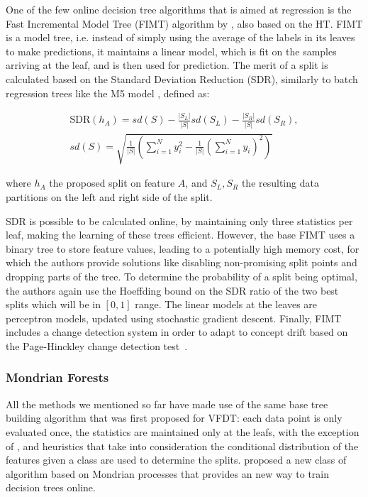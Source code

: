 One of the few online decision tree algorithms that is aimed at regression
is the Fast Incremental Model Tree (FIMT) algorithm by \citet{fimt}, also
based on the HT. FIMT
is a model tree, i.e. instead of simply using the average of the labels
in its leaves to make predictions, it maintains a linear model, which is
fit on the samples arriving at the leaf, and is then used for prediction.
The merit of a split is calculated based on the Standard Deviation Reduction (SDR),
similarly to batch regression trees like the M5 model \cite{m5-tree}, defined as:

\begin{equation}
	\begin{split}
		\text{SDR}(h_A)=sd(S)-\frac{|S_L|}{|S|}sd\left(S_{L}\right)-\frac{|S_R|}{|S|}sd\left(S_{R}\right), \\
		sd(S) = \sqrt{\frac{1}{|S|}\left(\sum_{i=1}^{N}y_{i}^{2}-\frac{1}{|S|}\left(\sum_{i=1}^{N}y_{i}\right)^{2}\right)}
	\end{split}
\end{equation}

\noindent
where $h_A$ the proposed split on feature $A$, and $S_L, S_R$ the resulting
data partitions on the left and right side of the split.

SDR is possible to be calculated online, by maintaining only three statistics per leaf,
making the learning of these trees efficient. However, the base FIMT uses a binary tree
to store feature values, leading to a potentially high memory cost, for which
the authors provide solutions like disabling non-promising split points and dropping
parts of the tree. To determine the
probability of a split being optimal, the authors again use the Hoeffding bound
on the SDR ratio of the two best splits which will be in $[0, 1]$ range.
The linear models at the leaves are perceptron models, updated using stochastic
gradient descent.  Finally, FIMT includes a change detection system in order to
adapt to concept drift
based on the Page-Hinckley change detection test~\cite{ph-test, ph-test2}.


\subsubsection*{Mondrian Forests}

All the methods we mentioned so far have made use of the same base tree building
algorithm that was first proposed for VFDT: each data point is only evaluated once,
the statistics are maintained only at the leafs, with the exception of \cite{efdt},
and heuristics that take into consideration the conditional distribution of the
features given a class are used to determine the splits. \citet{mondrian-forests-original}
proposed a new class of algorithm based on Mondrian processes \cite{mondrian-process}
that provides an new way to train decision trees online.

